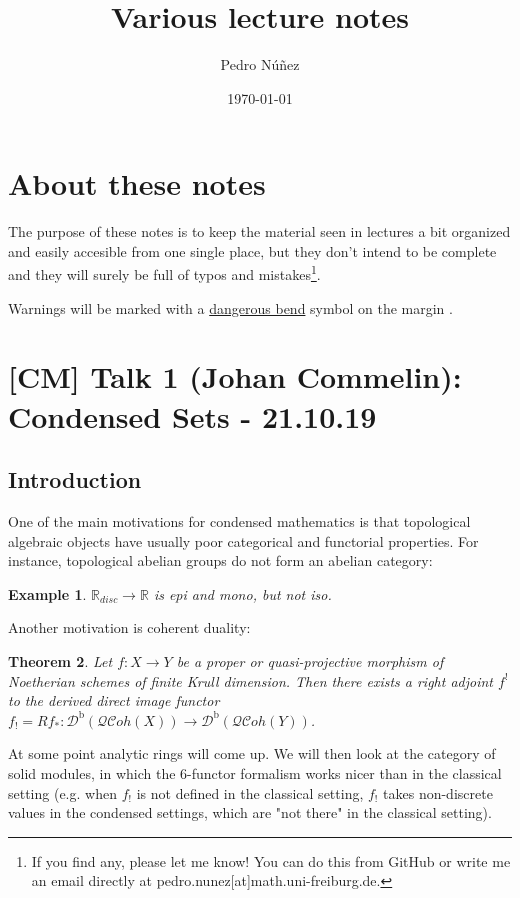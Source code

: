 \documentclass[12pt]{article}
\title{Various lecture notes}
\author{Pedro Núñez}
\date{\today}
\theoremstyle{darkgreentheorem}
\newtheorem{thm}{Theorem}[section]
\theoremstyle{darkbluedefinition}
\theoremstyle{darkredexample}
\newtheorem{exa}[thm]{Example}
\theoremstyle{remark}
\newcommand{\R}{\mathbb{R}}
\newcommand{\1}{\mathbbm{1}}
\newcommand{\Db}{\mathscr{D}^{\mathrm{b}}}
\newcommand{\QCoh}{\mathscr{QC}oh}
\newcommand{\db}{\marginnote{\dbend}}
\begin{document}
\maketitle

\tableofcontents

\section{About these notes}

The purpose of these notes is to keep the material seen in lectures a bit organized and easily accesible from one single place, but they don't intend to be complete and they will surely be full of typos and mistakes\footnote{If you find any, please let me know! You can do this from GitHub or write me an email directly at pedro.nunez[at]math.uni-freiburg.de.}.

Warnings will be marked with a \href{https://en.wikipedia.org/wiki/Bourbaki_dangerous_bend_symbol}{dangerous bend} symbol on the margin \db.

\section{[CM] Talk 1 (Johan Commelin): Condensed Sets - 21.10.19}

\subsection{Introduction}

One of the main motivations for condensed mathematics is that topological algebraic objects have usually poor categorical and functorial properties.
For instance, topological abelian groups do not form an abelian category:

\begin{exa}
    $\R_{disc}\to \R$ is epi and mono, but not iso.
\end{exa}

Another motivation is coherent duality:

\begin{thm}
    Let $f\colon X\to Y$ be a proper or quasi-projective morphism of Noetherian schemes of finite Krull dimension. Then there exists a right adjoint $f^{!}$ to the derived direct image functor $f_{!}=Rf_{*}\colon \Db(\QCoh(X))\to \Db(\QCoh(Y))$.
\end{thm}

At some point analytic rings will come up.
We will then look at the category of solid modules, in which the 6-functor formalism works nicer than in the classical setting (e.g. when $f_{!}$ is not defined in the classical setting, $f_{!}$ takes non-discrete values in the condensed settings, which are "not there" in the classical setting).
\end{document}

